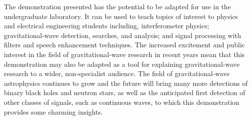 \documentclass[paper-main.tex]{subfiles}
\begin{document}
The demonstration presented has the potential to be adapted for use in the undergraduate laboratory.
It can be used to teach topics of interest to physics and electrical engineering students including, interferometer physics; gravitational-wave detection, searches, and analysis; and signal processing with filters and speech enhancement techniques. 
The increased excitement and public interest in the field of gravitational-wave research in recent years mean that this demonstration may also be adapted as a tool for explaining gravitational-wave research to a wider, non-specialist audience. 
The field of gravitational-wave astrophysics continues to grow and the future will bring many more detections of binary black holes and neutron stars, as well as the anticipated first detection of other classes of signals, such as continuous waves, to which this demonstration provides some charming insights. 




\end{document}
